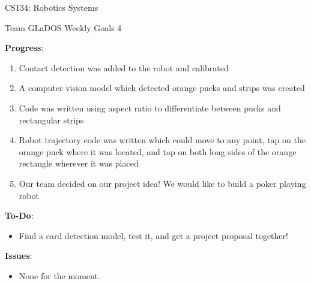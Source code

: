 \documentclass[12 pt]{article}
\newcommand{\setnum}{4}
\begin{document}
\begin{center}
    \Large \color{blue} CS134: Robotics Systems\color{black}
    \begin{center}\normalsize Team GLaDOS Weekly Goals \setnum{}\end{center}
    \noindent{\color{black} \rule{\linewidth}{0.5mm} }
\end{center}

\textbf{Progress}:
    \begin{enumerate}
        \item Contact detection was added to the robot and calibrated
        \item A computer vision model which detected orange pucks and strips was 
        created
        \item Code was written using aspect ratio to differentiate between pucks
        and rectangular strips
        \item Robot trajectory code was written which could move to any point, 
        tap on the orange puck where it was located, and tap on both long sides 
        of the orange rectangle wherever it was placed
        \item Our team decided on our project idea! We would like to build a poker 
        playing robot
    \end{enumerate}

\textbf{To-Do}:
    \begin{itemize}
        \item Find a card detection model, test it, and get a project proposal 
        together!
    \end{itemize}

\textbf{Issues}:
    \begin{itemize}
        \item None for the moment.
    \end{itemize}
\end{document}
